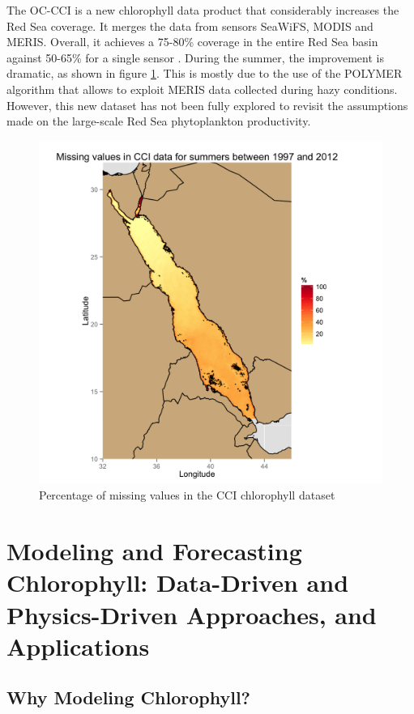 The OC-CCI is a new chlorophyll data product that considerably increases the
Red Sea coverage. It merges the data from sensors SeaWiFS, MODIS and MERIS.
Overall, it achieves a 75-80\% coverage in the entire Red Sea basin against
50-65\% for a single sensor \citep{Racault}. During the summer, the improvement
is dramatic, as shown in figure \ref{misval_cci}. This is mostly due to the use of
the POLYMER algorithm \citep{Steinmetz2011} that allows to exploit MERIS data
collected during hazy conditions. However, this new dataset has not been fully
explored to revisit the assumptions made on the large-scale Red Sea
phytoplankton productivity.

\begin{figure}[h]
    \centering
    \includegraphics[scale=.15]{figures/cci_missing_values_summer.png}
    \caption{Percentage of missing values in the CCI chlorophyll dataset}
    \label{misval_cci}
\end{figure}

\section{Modeling and Forecasting Chlorophyll: Data-Driven and Physics-Driven
Approaches, and Applications}

\subsection{Why Modeling Chlorophyll?}

